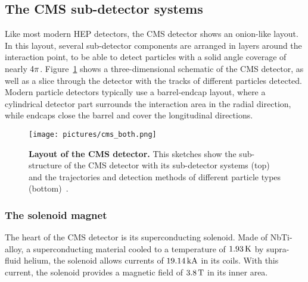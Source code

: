 \subsection{The \ac{CMS} sub-detector systems}
Like most modern \ac{HEP} detectors, the \ac{CMS} detector shows an onion-like layout. In this layout, several sub-detector components are arranged in layers around the interaction point, to be able to detect particles with a solid angle coverage of nearly $4\rm{\pi}$. Figure~\ref{fig:CMS_layout} shows a three-dimensional schematic of the \ac{CMS} detector, as well as a slice through the detector with the tracks of different particles detected. Modern particle detectors typically use a barrel-endcap layout, where a cylindrical detector part surrounds the interaction area in the radial direction, while endcaps close the barrel and cover the longitudinal directions. 
\begin{figure}
\begin{center}
\texttt{[image: pictures/cms\_both.png]}
\end{center}
\caption[Layout of the CMS detector]{\textbf{Layout of the \ac{CMS} detector.} This sketches show the sub-structure of the \ac{CMS} detector with its sub-detector systems (top)~\cite{CMS11b} and the trajectories and detection methods of different particle types (bottom)~\cite{INF07}.}\label{fig:CMS_layout}
\end{figure}
\subsubsection{The solenoid magnet}
The heart of the \ac{CMS} detector is its superconducting solenoid. Made of NbTi-alloy, a superconducting material cooled to a temperature of $1.93\,\rm{K}$ by supra-fluid helium, the solenoid allows currents of $19.14\,\rm{kA}$ in its coils. With this current, the solenoid provides a magnetic field of $3.8\,\rm{T}$ in its inner area.

